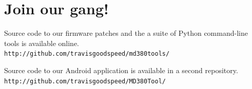 \documentclass[
]{leaflet}
\begin{document}
\section{}



\section{Join our gang!}

Source code to our firmware patches and the a suite of Python command-line
tools is available online.
\\{\tt http://github.com/travisgoodspeed/md380tools/}

Source code to our Android application is available in a second repository.
\\{\tt http://github.com/travisgoodspeed/MD380Tool/}
\loggingall
\end{document}
